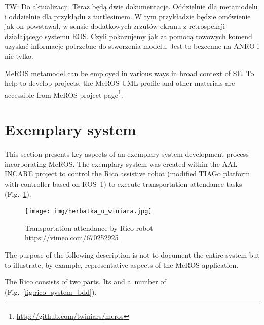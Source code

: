 \documentclass[11pt,oneside,a4paper]{report}
\newcommand{\twci}[1]{
	\textcolor{amber}{TW: #1}}
\begin{document}
	\twci{Do aktualizacji. Teraz będą dwie dokumentacje. Oddzielnie dla metamodelu i oddzielnie dla przykłądu z turtlesimem. W tym przykładzie będzie omówienie jak on powstawał, w sensie dodatkowych zrzutów ekranu z retrospekcji działającego systemu ROS. Czyli pokazujemy jak za pomocą rowowych komend uzyskać informacje potrzebne do stworzenia modelu. Jest to bezcenne na ANRO i nie tylko.}
	
	MeROS metamodel can be employed in various ways in broad context of SE. To help to develop projects, the MeROS UML profile and other materials are accessible from MeROS project page\footnote{\url{http://github.com/twiniars/meros}}. 
	
	
\section{Exemplary system}
\label{ch:application-example}

	This section presents key aspects of an exemplary system development process incorporating MeROS. The exemplary system was created within the AAL INCARE project to control the Rico assistive robot (modified TIAGo platform with controller based on ROS~1) to execute transportation attendance tasks (Fig.~\ref{fig:herbatka_u_winiara}).
	
	\begin{figure}[H]
		\centering
		\begin{center}
			{\texttt{[image: img/herbatka\_u\_winiara.jpg]}}
		\end{center}
		\caption{Transportation attendance by Rico robot \url{https://vimeo.com/670252925}} 
		\label{fig:herbatka_u_winiara}
	\end{figure}
	
	
	
	 The purpose of the following description is not to document the entire system but to illustrate, by example, representative aspects of the MeROS application.
	 
	\newpage
	The Rico \stSystem{} consists of two parts. Its \stWorkspace{} and a~number of \stRunSystemCompon{} (Fig.~\ref{fig:rico_system_bdd}).
	
\end{document}
